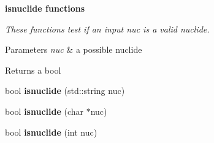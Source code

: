 \begin{Indent}{\bf isnuclide functions}\par
{\em These functions test if an input {\itshape nuc} is a valid nuclide. 
\begin{DoxyParams}{Parameters}
{\em nuc} & a possible nuclide \\
\hline
\end{DoxyParams}
\begin{DoxyReturn}{Returns}
a bool 
\end{DoxyReturn}
}\begin{DoxyCompactItemize}
\item 
\hypertarget{namespacepyne_1_1nucname_a98523777b3d9e835b929bb9e49986312}{bool {\bfseries isnuclide} (std\-::string nuc)}\label{namespacepyne_1_1nucname_a98523777b3d9e835b929bb9e49986312}

\item 
\hypertarget{namespacepyne_1_1nucname_a8c10e17441e560982994f31011c888a4}{bool {\bfseries isnuclide} (char $\ast$nuc)}\label{namespacepyne_1_1nucname_a8c10e17441e560982994f31011c888a4}

\item 
\hypertarget{namespacepyne_1_1nucname_a78423ab514ba698a3e86d808423f364b}{bool {\bfseries isnuclide} (int nuc)}\label{namespacepyne_1_1nucname_a78423ab514ba698a3e86d808423f364b}

\end{DoxyCompactItemize}
\end{Indent}
